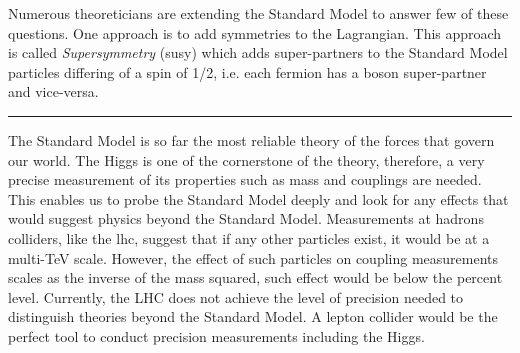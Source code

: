 Numerous theoreticians are extending the Standard Model to answer few of these questions. One approach is to add symmetries to the Lagrangian. This approach is called \textit{Supersymmetry} (\acrshort{susy}) which adds super-partners to the Standard Model particles differing of a spin of 1/2, i.e. each fermion has a boson super-partner and vice-versa.

\begin{center}
  \rule{0.5\textwidth}{.4pt}
\end{center}

The Standard Model is so far the most reliable theory of the forces that govern our world. The Higgs is one of the cornerstone of the theory, therefore, a very precise measurement of its properties such as mass and couplings are needed. This enables us to probe the Standard Model deeply and look for any effects that would suggest physics beyond the Standard Model. Measurements at hadrons colliders, like the \acrlong{lhc}, suggest that if any other particles exist, it would be at a multi-TeV scale. However, the effect of such particles on coupling measurements scales as the inverse of the mass squared, such effect would be below the percent level. Currently, the LHC does not achieve the level of precision needed to distinguish theories beyond the Standard Model. A lepton collider would be the perfect tool to conduct precision measurements including the Higgs.
